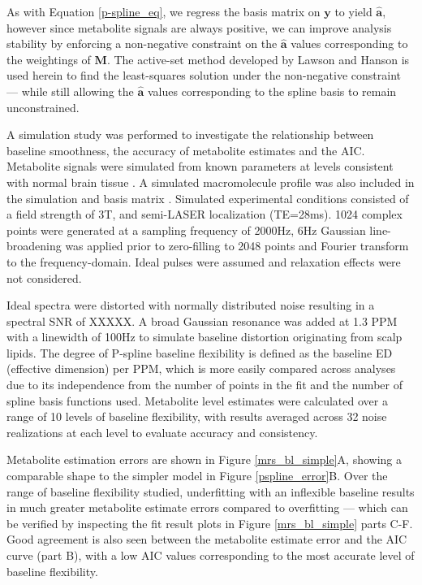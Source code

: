 \documentclass[num-refs]{wiley-article}
\begin{document}
As with Equation \ref{p-spline_eq}, we regress the basis matrix on $\mathbf{y}$ to yield $\hat{\mathbf{a}}$, however since metabolite signals are always positive, we can improve analysis stability by enforcing a non-negative constraint on the $\hat{\mathbf{a}}$ values corresponding to the weightings of $\mathbf{M}$. The active-set method developed by Lawson and Hanson \cite{Lawson1995} is used herein to find the least-squares solution under the non-negative constraint --- while still allowing the $\hat{\mathbf{a}}$ values corresponding to the spline basis to remain unconstrained.


A simulation study was performed to investigate the relationship between baseline smoothness, the accuracy of metabolite estimates and the AIC. Metabolite signals were simulated from known parameters \cite{Govind2015} at levels consistent with normal brain tissue \cite{deGraaf2018}. A simulated macromolecule profile was also included in the simulation and basis matrix \cite{Birch2017}. Simulated experimental conditions consisted of a field strength of 3T, and semi-LASER localization (TE=28ms). 1024 complex points were generated at a sampling frequency of 2000Hz, 6Hz Gaussian line-broadening was applied prior to zero-filling to 2048 points and Fourier transform to the frequency-domain. Ideal pulses were assumed and relaxation effects were not considered.

Ideal spectra were distorted with normally distributed noise resulting in a spectral SNR of XXXXX. A broad Gaussian resonance was added at 1.3 PPM with a linewidth of 100Hz to simulate baseline distortion originating from scalp lipids. The degree of P-spline baseline flexibility is defined as the baseline ED (effective dimension) per PPM, which is more easily compared across analyses due to its independence from the number of points in the fit and the number of spline basis functions used. Metabolite level estimates were calculated over a range of 10 levels of baseline flexibility, with results averaged across 32 noise realizations at each level to evaluate accuracy and consistency.



Metabolite estimation errors are shown in Figure \ref{mrs_bl_simple}A, showing a comparable shape to the simpler model in Figure \ref{pspline_error}B. Over the range of baseline flexibility studied, underfitting with an inflexible baseline results in much greater metabolite estimate errors compared to overfitting --- which can be verified by inspecting the fit result plots in Figure \ref{mrs_bl_simple} parts C-F. Good agreement is also seen between the metabolite estimate error and the AIC curve (part B), with a low AIC values corresponding to the most accurate level of baseline flexibility.
\end{document}
